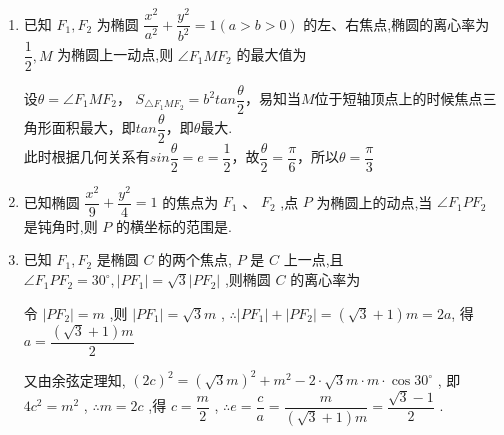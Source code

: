 \begin{enumerate}
\begin{enumerate}
        \begin{jieda}
            设$|PF_1| = t$，则$|PF_2| = 2a-t$，根据余弦定理有$4c^2 = t^2 + (2a-t)^2 - 2t(2a-t)cos\theta$，即$4c^2 = 4a^2 - 2(1+cos\theta)t(2a-t)$，因此$t(2a-t) = \dfrac{2b^2}{1+cos\theta}$，故$S = \dfrac{1}{2} \times t(4-t) \times sin\theta = b^2tan\dfrac{\theta}{2}$
        \end{jieda}
        \item 已知 ${F}_{1},{F}_{2}$ 为椭圆 $\dfrac{{x}^{2}}{{a}^{2}} + \dfrac{{y}^{2}}{{b}^{2}} = 1\left( {a > b > 0}\right)$ 的左、右焦点,椭圆的离心率为 $\dfrac{1}{2},M$ 为椭圆上一动点,则 $\angle {F}_{1}M{F}_{2}$ 的最大值为
        \begin{jieda}
            设$\theta = \angle {F}_{1}M{F}_{2}$，
            $S_{\triangle {F}_{1}M{F}_{2}} = b^2tan\dfrac{\theta}{2}$，易知当$M$位于短轴顶点上的时候焦点三角形面积最大，即$tan\dfrac{\theta}{2}$，即$\theta$最大. \\
            此时根据几何关系有$sin\dfrac{\theta}{2} = e = \dfrac{1}{2}$，故$\dfrac{\theta}{2} = \dfrac{\pi}{6}$，所以$\theta = \dfrac{\pi}{3}$
        \end{jieda}
            
        \item 已知椭圆 $\dfrac{{x}^{2}}{9} + \dfrac{{y}^{2}}{4} = 1$ 的焦点为 ${F}_{1}$ 、 ${F}_{2}$ ,点 $P$ 为椭圆上的动点,当 $\angle {F}_{1}P{F}_{2}$ 是钝角时,则 $P$ 的横坐标的范围是.
        
        \item 已知 ${F}_{1},{F}_{2}$ 是椭圆 $C$ 的两个焦点, $P$ 是 $C$ 上一点,且 $\angle {F}_{1}P{F}_{2} = {30}^{ \circ  },\left| {P{F}_{1}}\right| = \sqrt{3}\left| {P{F}_{2}}\right|$ ,则椭圆 $C$ 的离心率为
        \begin{jieda}
            令 $\left| {P{F}_{2}}\right|  = m$ ,则 $\left| {P{F}_{1}}\right|  = \sqrt{3}m$ , $\therefore \left| {P{F}_{1}}\right|  + \left| {P{F}_{2}}\right|  = \left( {\sqrt{3} + 1}\right) m = {2a}$, 得 $a = \dfrac{\left( {\sqrt{3} + 1}\right) m}{2}$
            
            又由余弦定理知, ${\left( 2c\right) }^{2} = {\left( \sqrt{3}m\right) }^{2} + {m}^{2} - 2 \cdot  \sqrt{3}m \cdot  m \cdot  \cos {30}^{ \circ  }$ , 即 $4{c}^{2} = {m}^{2}$ , $\therefore m = {2c}$ ,得 $c = \dfrac{m}{2}$ , $\therefore e = \dfrac{c}{a} = \dfrac{m}{\left( {\sqrt{3} + 1}\right) m} = \dfrac{\sqrt{3} - 1}{2}$ .


\end{jieda}
\end{enumerate}
\end{enumerate}
